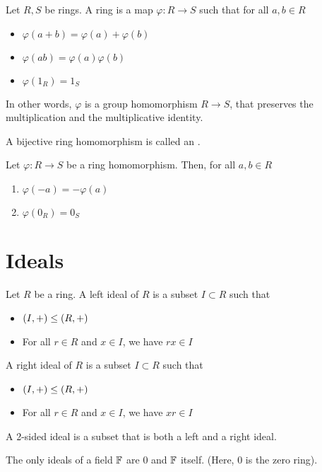 \documentclass[11pt]{penrose}
\begin{document}
\begin{ndfn}
    Let $R, S$ be rings. A ring  is a map $\varphi : R \to S$ such that for all $a, b \in R$
    \begin{itemize}
        \item $\varphi(a + b) = \varphi(a) + \varphi(b)$
        \item $\varphi(ab) = \varphi(a)\varphi(b)$
        \item $\varphi(1_R) = 1_S$
    \end{itemize}
    In other words, $\varphi$ is a group homomorphism $R \to S$, that preserves the multiplication and the multiplicative identity.
\end{ndfn}

\begin{ndfn}
    A bijective ring homomorphism is called an .
\end{ndfn}

\begin{nthm}
    Let $\varphi : R \to S$ be a ring homomorphism. Then, for all $a, b \in R$
    \begin{enumerate}[label=(\roman*)]
        \item $\varphi(-a) = -\varphi(a)$
        \item $\varphi(0_R) = 0_S$
    \end{enumerate}
\end{nthm}

\section{Ideals}

\begin{ndfn}
    Let $R$ be a ring. A left ideal of $R$ is a subset $I \subset R$ such that
    \begin{itemize}
        \item $(I,+) \mathrel{\leq} (R,+)$
        \item For all $r \in R$ and $x \in I$, we have $rx \in I$
    \end{itemize}
    A right ideal of $R$ is a subset $I \subset R$ such that
    \begin{itemize}
        \item $(I,+) \mathrel{\leq} (R,+)$
        \item For all $r \in R$ and $x \in I$, we have $xr \in I$
    \end{itemize}
    A 2-sided ideal is a subset that is both a left and a right ideal.
\end{ndfn}

\begin{nlemma}
    The only ideals of a field $\mathbb{F}$ are $0$ and $\mathbb{F}$ itself. (Here, $0$ is the zero ring).
\end{nlemma}
\end{document}
